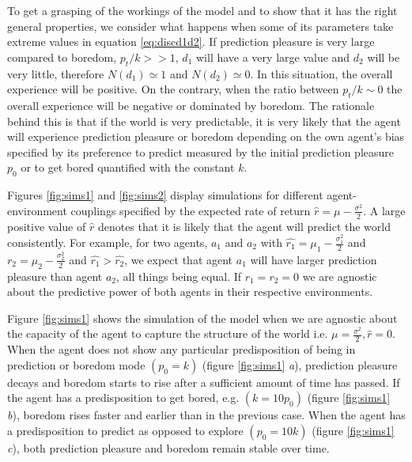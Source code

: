 \documentclass[11pt, onecolumn]{article}
\begin{document}
To get a grasping of the workings of the model and to show that it has the right general properties, we consider what happens when some of its parameters take extreme values in equation \ref{eq:discd1d2}. If prediction pleasure is very large compared to boredom, $p_t/k >> 1$, $d_1$ will have a very large value and $d_2$ will be very little, therefore $N(d_1) \simeq 1$ and $N(d_2) \simeq 0$. In this situation, the overall experience will be positive. On the contrary, when the ratio between $p_t/k \sim 0$ the overall experience will be negative or dominated by boredom. 
The rationale behind this is that if the world is very predictable, it is very likely that the agent will experience prediction pleasure or boredom depending on the own agent's bias specified by its preference to predict measured by the initial prediction pleasure $p_0$ or to get bored quantified with the constant $k$.

Figures \ref{fig:sims1} and \ref{fig:sims2} display simulations for different agent-environment couplings specified by the expected rate of return $\hat{r} = \mu - \frac{\sigma ^2}{2} $. A large positive value of $\hat{r}$ denotes that it is likely that the agent will predict the world consistently. 
For example, for two agents, $a_1$ and $a_2$ with $\hat{r_1} = \mu_1 - \frac{\sigma_1 ^2}{2}$ and $\hat{r_2} = \mu_2 - \frac{\sigma_2 ^2}{2}$ and $\hat{r_1} > \hat{r_2}$, we expect that agent $a_1$ will have larger prediction pleasure than agent $a_2$, all things being equal. If $r_1 =r_2 = 0$ we are agnostic about the predictive power of both agents in their respective environments. 

Figure \ref{fig:sims1} shows the simulation of the model when we are agnostic about the capacity  of the agent to capture the structure of the world i.e. $\mu  = \frac{\sigma ^2}{2}, \hat{r} =0$. When the agent does not show any particular predisposition of being in prediction or boredom mode $(p_0 = k)$ (figure \ref{fig:sims1} \emph{a}), prediction pleasure decays and boredom starts to rise after a sufficient amount of time has passed. If the agent has a predisposition to  get bored, e.g. $(k = 10p_0)$ (figure \ref{fig:sims1} \emph{b}), boredom rises faster and earlier than in the previous case. When the agent has a predisposition to predict as opposed to explore $( p_0 = 10k )$ (figure \ref{fig:sims1} \emph{c}), both prediction pleasure and boredom remain stable over time.
\end{document}

